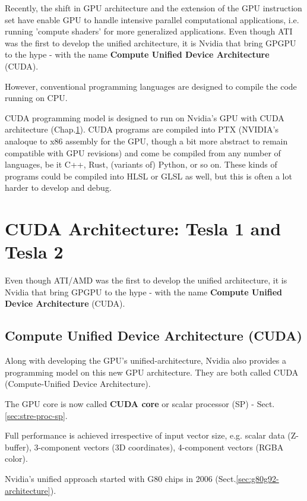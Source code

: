 Recently, the shift in GPU architecture and the extension of the GPU instruction
set have enable GPU to handle intensive parallel computational applications,
i.e. running 'compute shaders' for more generalized applications.
Even though ATI was the first to develop the unified architecture, it is Nvidia
that bring GPGPU to the hype - with the name {\bf Compute Unified Device
Architecture} (CUDA). 

However, conventional programming languages are designed to compile the code
running on CPU.

CUDA programming model is designed to run on Nvidia's GPU with CUDA architecture
(Chap.\ref{chap:cuda-gpu-architecture}). CUDA programs are compiled into PTX
(NVIDIA's analoque to x86 assembly for the GPU, though a bit more abstract to
remain compatible with GPU revisions) and come be compiled from any number of
languages, be it C++, Rust, (variants of) Python, or so on. These kinds of
programs could be compiled into HLSL or GLSL as well, but this is often a lot
harder to develop and debug.


\chapter{CUDA Architecture: Tesla 1 and Tesla 2}
\label{chap:cuda-gpu-architecture}

Even though ATI/AMD was the first to develop the unified architecture, it is Nvidia
that bring GPGPU to the hype - with the name {\bf Compute Unified Device
Architecture} (CUDA).

\section{Compute Unified Device Architecture (CUDA)}
\label{sec:gpu-unif-arch}

Along with developing the GPU's unified-architecture, Nvidia also provides a
programming model on this new GPU architecture. They are both called CUDA
(Compute-Unified Device Architecture).

The GPU core is now called {\bf CUDA core} or scalar processor (SP) -
Sect.\ref{sec:stre-proc-sp}.

 
Full performance is achieved irrespective of input vector size, e.g. scalar data
(Z-buffer), 3-component vectors (3D coordinates), 4-component vectors (RGBA
color).

Nvidia's unified approach started with G80 chips in 2006
(Sect.\ref{sec:g80g92-architecture}).


